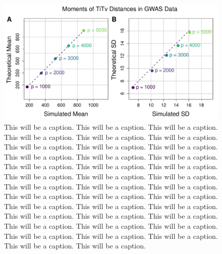 \documentclass[10pt,letterpaper]{article}\usepackage[]{graphicx}\usepackage[]{color}
\begin{document}
\begin{figure}[H]
	\includegraphics[width=\textwidth]{compared_moments_gwas_titv2.pdf}
	\caption{This will be a caption. This will be a caption. This will be a caption. This will be a caption. This will be a caption. This will be a caption. This will be a caption. This will be a caption. This will be a caption. This will be a caption. This will be a caption. This will be a caption. This will be a caption. This will be a caption. This will be a caption. This will be a caption. This will be a caption. This will be a caption. This will be a caption. This will be a caption. This will be a caption. This will be a caption. This will be a caption. This will be a caption. This will be a caption. This will be a caption. This will be a caption. This will be a caption. This will be a caption. This will be a caption. This will be a caption. This will be a caption. This will be a caption. This will be a caption. This will be a caption. This will be a caption. This will be a caption. This will be a caption.}
\end{figure}
\end{document}
